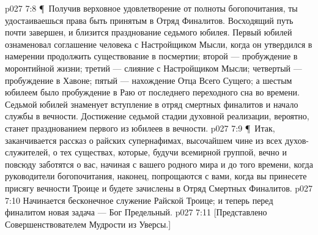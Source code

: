 \vs p027 7:8 \P\ Получив верховное удовлетворение от полноты богопочитания, ты удостаиваешься права быть принятым в Отряд Финалитов. Восходящий путь почти завершен, и близится празднование седьмого юбилея. Первый юбилей ознаменовал соглашение человека с Настройщиком Мысли, когда он утвердился в намерении продолжить существование в посмертии; второй --- пробуждение в моронтийной жизни; третий --- слияние с Настройщиком Мысли; четвертый --- пробуждение в Хавоне; пятый --- нахождение Отца Всего Сущего; а шестым юбилеем было пробуждение в Раю от последнего переходного сна во времени. Седьмой юбилей знаменует вступление в отряд смертных финалитов и начало службы в вечности. Достижение седьмой стадии духовной реализации, вероятно, станет празднованием первого из юбилеев в вечности.
\vs p027 7:9 \P\ Итак, заканчивается рассказ о райских супернафимах, высочайшем чине из всех духов\hyp{}служителей, о тех существах, которые, будучи всемирной группой, вечно и повсюду заботятся о вас, начиная с вашего родного мира и до того времени, когда руководители богопочитания, наконец, попрощаются с вами, когда вы принесете присягу вечности Троице и будете зачислены в Отряд Смертных Финалитов.
\vs p027 7:10 Начинается бесконечное служение Райской Троице; и теперь перед финалитом новая задача --- Бог Предельный.
\vs p027 7:11 [Представлено Совершенствователем Мудрости из Уверсы.]
